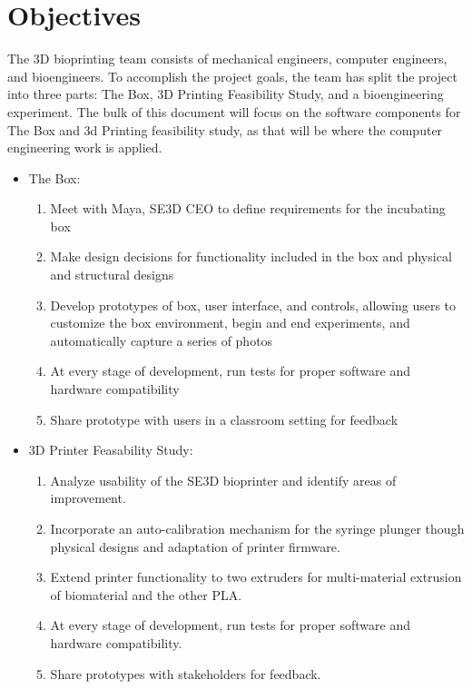 

\section{Objectives}

The 3D bioprinting team consists of mechanical engineers, computer engineers, and bioengineers. To accomplish the project goals, the team has split the project into three parts: The Box, 3D Printing Feasibility Study, and a bioengineering experiment. The bulk of this document will focus on the software components for The Box and 3d Printing feasibility study, as that will be where the computer engineering work is applied.
\begin{itemize}
	\item  The Box:\\
	\begin{enumerate}
		\item Meet with Maya, SE3D CEO to define requirements for the incubating box
		\item Make design decisions for functionality included in the box and physical and structural designs
		\item Develop prototypes of box, user interface, and controls, allowing users to customize the box environment, begin and end experiments, and automatically capture a series of photos
		\item At every stage of development, run tests for proper software and hardware compatibility
		\item Share prototype with users in a classroom setting for feedback
	\end{enumerate}
	\item 3D Printer Feasability Study:\\
	\begin{enumerate}
		\item Analyze usability of the SE3D bioprinter and identify areas of improvement.

		\item Incorporate an auto-calibration mechanism for the syringe plunger though physical designs and adaptation of printer firmware.

		\item Extend printer functionality to two extruders for multi-material extrusion of biomaterial and the other PLA.

		\item At every stage of development, run tests for proper software and hardware compatibility.

		\item Share prototypes with stakeholders for feedback.
	\end{enumerate}
\end{itemize}
